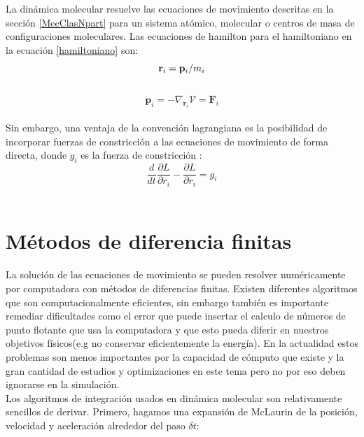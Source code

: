 La dinámica molecular resuelve las ecuaciones de movimiento descritas en la sección \ref{MecClasNpart} para un sistema atómico, molecular o centros de masa de configuraciones moleculares. Las ecuaciones de hamilton para el hamiltoniano en la ecuación \ref{hamiltoniano} son:\\

\begin{equation}
    \mathbf{r}_i = \mathbf{p}_i/m_i \\
\end{equation}\\
\begin{equation}
    \mathbf{\dot p}_i = -\nabla_{\mathbf{r}_i}\mathcal{V} = \mathbf{F}_i
\end{equation}\\

Sin embargo, una ventaja de la convención lagrangiana es la posibilidad de incorporar fuerzas de constricción a las ecuaciones de movimiento de forma directa, donde $g_i$ es la fuerza de constricción \cite{raabe2017}:\\

\begin{equation} \label{lagrangeeqconstraint}
    \frac{d}{dt}\frac{\partial L}{\partial \dot r_i} - \frac{\partial L}{\partial r_i} = g_i
\end{equation}\\

\section{Métodos de diferencia finitas}

La solución de las ecuaciones de movimiento se pueden resolver numéricamente por computadora con métodos de diferencias finitas. Existen diferentes algoritmos que son computacionalmente eficientes, sin embargo también es importante remediar dificultades como el error que puede insertar el calculo de números de punto flotante que usa la computadora y que esto pueda diferir en nuestros objetivos físicos(e.g no conservar eficientemente la energía). En la actualidad estos problemas son menos importantes por la capacidad de cómputo que existe y la gran cantidad de estudios y optimizaciones en este tema pero no por eso deben ignorarse en la simulación.\\

Los algoritmos de integración usados en dinámica molecular son relativamente sencillos de derivar. Primero, hagamos una expansión de McLaurin de la posición, velocidad y aceleración alrededor del paso $\delta t$:


